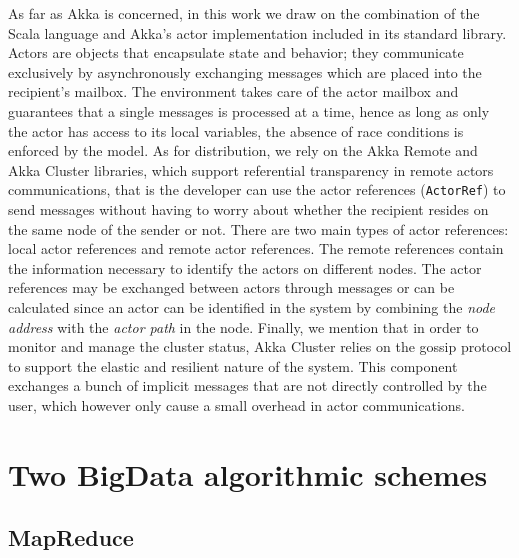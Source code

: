 \documentclass[a4paper]{article}
\numberwithin{equation}{section}
\begin{document}
As far as Akka is concerned, in this work we draw on the combination
of the Scala language and Akka's actor implementation  included 
in its standard library. 
Actors are objects that encapsulate state and behavior; they
communicate exclusively by asynchronously exchanging messages which
are placed into the recipient's mailbox.
The environment takes care of the actor mailbox and guarantees
that a single messages is processed at a time, hence as long
as only the actor has access to its local variables, the absence
of race conditions is enforced by the model.
As for distribution, we rely on the Akka Remote and Akka Cluster
libraries, which support referential transparency in remote
actors communications, that is the developer can use the actor
references (\verb+ActorRef+) to send messages without having to worry
about whether the recipient resides on the same node of the sender or
not.  
There are two main types of actor references: local actor references
and remote actor references. The remote references contain the 
information necessary to identify the actors on different nodes.
The actor references may be exchanged between actors through messages 
or can be calculated since an actor can be identified in the system 
by combining the \emph{node address} with the
\emph{actor path} in the node.
Finally, we mention that in order to monitor and manage the cluster
status, Akka Cluster relies 
on the gossip protocol to support the elastic and
resilient nature of the system. This component exchanges a
bunch of implicit messages that are not directly controlled by the
user, which however only cause a small overhead in actor
communications.  


\section{Two BigData algorithmic schemes}\label{sec:algoMR-BSP}

\subsection{MapReduce}
\end{document}
